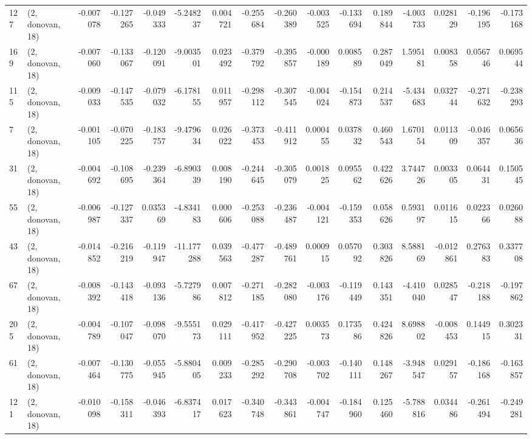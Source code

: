 \begin{tabular}{llrrrrrrrrrrrrrr}
127 &  (2, donovan, 18) &  -0.007078 & -0.127265 & -0.049333 &   -5.248237 &  0.004721 &  -0.255684 & -0.260389 & -0.003525 & -0.133694 &  0.189844 &   -4.003733 &  0.028129 & -0.196195 & -0.173168 \\
169 &  (2, donovan, 18) &  -0.007060 & -0.133067 & -0.120091 &   -9.003501 &  0.023492 &  -0.379792 & -0.395857 & -0.000189 &  0.008589 &  0.287049 &    1.595181 &  0.008358 &  0.056746 &  0.069544 \\
115 &  (2, donovan, 18) &  -0.009033 & -0.147535 & -0.079032 &   -6.178155 &  0.011957 &  -0.298112 & -0.307545 & -0.004024 & -0.154873 &  0.214537 &   -5.434683 &  0.032744 & -0.271632 & -0.238293 \\
7   &  (2, donovan, 18) &  -0.001105 & -0.070225 & -0.183757 &   -9.479634 &  0.026022 &  -0.373453 & -0.411912 &  0.000455 &  0.037832 &  0.460543 &    1.670154 &  0.011309 & -0.046357 &  0.065636 \\
31  &  (2, donovan, 18) &  -0.004692 & -0.108695 & -0.239364 &   -6.890339 &  0.008190 &  -0.244645 & -0.305079 &  0.001825 &  0.095562 &  0.422626 &    3.744726 &  0.003305 &  0.064431 &  0.150545 \\
55  &  (2, donovan, 18) &  -0.006987 & -0.127337 &  0.035369 &   -4.834183 &  0.000606 &  -0.253088 & -0.236487 & -0.004121 & -0.159353 &  0.058626 &    0.593197 &  0.011615 &  0.022366 &  0.026088 \\
43  &  (2, donovan, 18) &  -0.014852 & -0.216219 & -0.119947 &  -11.177288 &  0.039563 &  -0.477287 & -0.489761 &  0.000915 &  0.057092 &  0.303826 &    8.588169 & -0.012861 &  0.276383 &  0.337708 \\
67  &  (2, donovan, 18) &  -0.008392 & -0.143418 & -0.093136 &   -5.727986 &  0.007812 &  -0.271185 & -0.282080 & -0.003176 & -0.119449 &  0.143351 &   -4.410040 &  0.028547 & -0.218188 & -0.197862 \\
205 &  (2, donovan, 18) &  -0.004789 & -0.107047 & -0.098070 &   -9.555173 &  0.029111 &  -0.417952 & -0.427225 &  0.003573 &  0.173586 &  0.424826 &    8.698802 & -0.008453 &  0.144915 &  0.302331 \\
61  &  (2, donovan, 18) &  -0.007464 & -0.130775 & -0.055945 &   -5.880405 &  0.009233 &  -0.285292 & -0.290708 & -0.003702 & -0.140111 &  0.148267 &   -3.948547 &  0.029157 & -0.186168 & -0.163857 \\
121 &  (2, donovan, 18) &  -0.010098 & -0.158311 & -0.046393 &   -6.837417 &  0.017623 &  -0.340748 & -0.343861 & -0.004747 & -0.184960 &  0.125460 &   -5.788816 &  0.034486 & -0.261494 & -0.249281 \\

\end{tabular}
